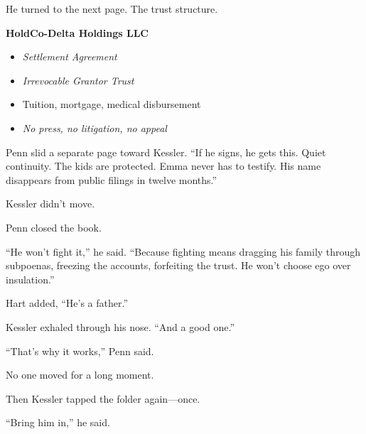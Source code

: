 He turned to the next page. The trust structure.

\textbf{HoldCo-Delta Holdings LLC}
\begin{itemize}
    \item \textit{Settlement Agreement}
    \item \textit{Irrevocable Grantor Trust}
    \item Tuition, mortgage, medical disbursement
    \item \textit{No press, no litigation, no appeal}
\end{itemize}

Penn slid a separate page toward Kessler. “If he signs, he gets this. Quiet continuity. The kids are protected. Emma never has to testify. His name disappears from public filings in twelve months.”

Kessler didn’t move.

Penn closed the book.

“He won’t fight it,” he said. “Because fighting means dragging his family through subpoenas, freezing the accounts, forfeiting the trust. He won’t choose ego over insulation.”

Hart added, “He’s a father.”

Kessler exhaled through his nose. “And a good one.”

“That’s why it works,” Penn said.

No one moved for a long moment.

Then Kessler tapped the folder again—once.

“Bring him in,” he said.

\medskip

